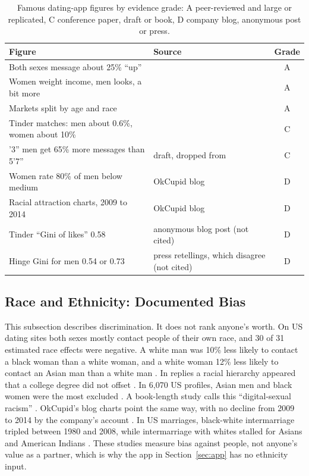 \documentclass[conference,a4paper]{IEEEtran}
\begin{document}
\begin{table}[t]
\centering
\caption{Famous dating-app figures by evidence grade: A peer-reviewed and large or replicated, C conference paper, draft or book, D company blog, anonymous post or press.}
\label{tab:appnums}
\footnotesize
\renewcommand{\arraystretch}{1.1}
\begin{tabular}{@{}>{\raggedright\arraybackslash}p{4.25cm}>{\raggedright\arraybackslash}p{2.75cm}c@{}}
\toprule
\textbf{Figure} & \textbf{Source} & \textbf{Grade}\\
\midrule
Both sexes message about 25\% ``up'' & \cite{bruch2018} & A\\
Women weight income, men looks, a bit more & \cite{hitsch2010qme} & A\\
Markets split by age and race & \cite{bruch2019} & A\\
Tinder matches: men about 0.6\%, women about 10\% & \cite{tyson2016} & C\\
6'3'' men get 65\% more messages than 5'7'' & 2006 draft, dropped from \cite{hitsch2010qme} & C\\
Women rate 80\% of men below medium & OkCupid blog \cite{rudder2009} & D\\
Racial attraction charts, 2009 to 2014 & OkCupid blog \cite{rudder2014race} & D\\
Tinder ``Gini of likes'' 0.58 & anonymous blog post (not cited) & D\\
Hinge Gini for men 0.54 or 0.73 & press retellings, which disagree (not cited) & D\\
\bottomrule
\end{tabular}
\end{table}

\subsection{Race and Ethnicity: Documented Bias}
This subsection describes discrimination. It does not rank anyone's worth. On US dating sites both sexes mostly contact people of their own race, and 30 of 31 estimated race effects were negative. A white man was 10\% less likely to contact a black woman than a white woman, and a white woman 12\% less likely to contact an Asian man than a white man \cite{hitsch2010qme}. In replies a racial hierarchy appeared that a college degree did not offset \cite{lin2013}. In 6,070 US profiles, Asian men and black women were the most excluded \cite{robnett2011}. A book-length study calls this ``digital-sexual racism'' \cite{curington2021}. OkCupid's blog charts point the same way, with no decline from 2009 to 2014 by the company's account \cite{rudder2014race}. In US marriages, black-white intermarriage tripled between 1980 and 2008, while intermarriage with whites stalled for Asians and American Indians \cite{qian2011}. These studies measure bias against people, not anyone's value as a partner, which is why the app in Section~\ref{sec:app} has no ethnicity input.
\end{document}
